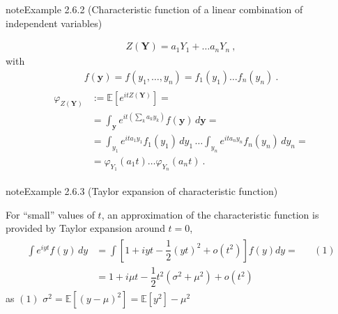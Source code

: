 \documentclass[letterpaper,10pt,english]{jupyterBook}
\begin{document}
\begin{sphinxadmonition}{note}{Example 2.6.2 (Characteristic function of a linear combination of independent variables)}


\begin{equation*}
\begin{split}Z(\mathbf{Y}) = a_1 Y_1 + \dots a_n Y_n \ ,\end{split}
\end{equation*}
\sphinxAtStartPar
with
\begin{equation*}
\begin{split}f(\mathbf{y}) = f(y_1, \dots, y_n) =  f_1(y_1) \dots f_n(y_n) \ .\end{split}
\end{equation*}\begin{equation*}
\begin{split}\begin{aligned}
  \varphi_{Z(\mathbf{Y})} 
  & := \mathbb{E}\left[ e^{i t Z(\mathbf{Y})} \right] = \\
  & = \int_{\mathbf{y}} e^{i t \left( \sum_k a_k y_k \right)} f(\mathbf{y}) \, d \mathbf{y} = \\
  & = \int_{y_1} e^{i t a_1 y_1} f_1(y_1) \, d y_1 \, \dots \int_{y_n} e^{i t a_n y_n} f_n(y_n) \, d y_n = \\
  & = \varphi_{Y_1}(a_1 t) \dots \varphi_{Y_n}(a_n t) \ . 
\end{aligned}\end{split}
\end{equation*}\end{sphinxadmonition}
\label{ch/prob/characteristic-fun:ex:char-fun:taylor}
\begin{sphinxadmonition}{note}{Example 2.6.3 (Taylor expansion of characteristic function)}



\sphinxAtStartPar
For “small” values of \(t\), an approximation of the characteristic function is provided by Taylor expansion around \(t=0\),
\begin{equation*}
\begin{split}\begin{aligned}
\int e^{ i y t } f(y) \, dy 
& = \int \left[ 1 + i y t - \dfrac{1}{2} (yt)^2 + o(t^2) \right] f(y) dy = && (1) \\
& = 1 + i \mu t - \dfrac{1}{2} t^2 \left( \sigma^2 + \mu^2 \right) + o(t^2)
\end{aligned}\end{split}
\end{equation*}
\sphinxAtStartPar
as \((1)\) \(\sigma^2 = \mathbb{E}[(y - \mu)^2] = \mathbb{E}[y^2] - \mu^2\)
\end{sphinxadmonition}
\end{document}

